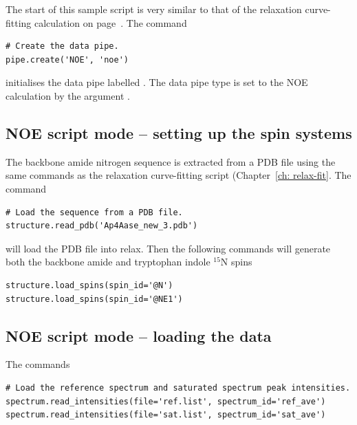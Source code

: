 The start of this sample script is very similar to that of the relaxation curve-fitting calculation on page~\pageref{Rx initialisation}.
The command

\begin{lstlisting}[firstnumber=3]
# Create the data pipe.
pipe.create('NOE', 'noe')
\end{lstlisting}

initialises the data pipe labelled .
The data pipe type is set to the NOE calculation by the argument .



\subsection{NOE script mode -- setting up the spin systems}

The backbone amide nitrogen sequence is extracted from a PDB file using the same commands as the relaxation curve-fitting script (Chapter~\ref{ch: relax-fit}.
The command

\begin{lstlisting}[firstnumber=6]
# Load the sequence from a PDB file.
structure.read_pdb('Ap4Aase_new_3.pdb')
\end{lstlisting}

will load the PDB file  into relax.
Then the following commands will generate both the backbone amide and tryptophan indole $^{15}$N spins

\begin{lstlisting}[firstnumber=8]
structure.load_spins(spin_id='@N')
structure.load_spins(spin_id='@NE1')
\end{lstlisting}



\subsection{NOE script mode -- loading the data}

The commands

\begin{lstlisting}[firstnumber=11]
# Load the reference spectrum and saturated spectrum peak intensities.
spectrum.read_intensities(file='ref.list', spectrum_id='ref_ave')
spectrum.read_intensities(file='sat.list', spectrum_id='sat_ave')
\end{lstlisting}

